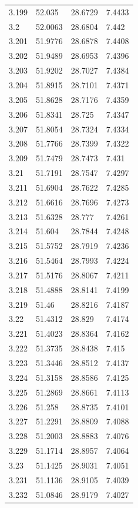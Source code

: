\begin{tabular}{llll}
3.199 & 52.035 & 28.6729 & 7.4433 \\
3.2 & 52.0063 & 28.6804 & 7.442 \\
3.201 & 51.9776 & 28.6878 & 7.4408 \\
3.202 & 51.9489 & 28.6953 & 7.4396 \\
3.203 & 51.9202 & 28.7027 & 7.4384 \\
3.204 & 51.8915 & 28.7101 & 7.4371 \\
3.205 & 51.8628 & 28.7176 & 7.4359 \\
3.206 & 51.8341 & 28.725 & 7.4347 \\
3.207 & 51.8054 & 28.7324 & 7.4334 \\
3.208 & 51.7766 & 28.7399 & 7.4322 \\
3.209 & 51.7479 & 28.7473 & 7.431 \\
3.21 & 51.7191 & 28.7547 & 7.4297 \\
3.211 & 51.6904 & 28.7622 & 7.4285 \\
3.212 & 51.6616 & 28.7696 & 7.4273 \\
3.213 & 51.6328 & 28.777 & 7.4261 \\
3.214 & 51.604 & 28.7844 & 7.4248 \\
3.215 & 51.5752 & 28.7919 & 7.4236 \\
3.216 & 51.5464 & 28.7993 & 7.4224 \\
3.217 & 51.5176 & 28.8067 & 7.4211 \\
3.218 & 51.4888 & 28.8141 & 7.4199 \\
3.219 & 51.46 & 28.8216 & 7.4187 \\
3.22 & 51.4312 & 28.829 & 7.4174 \\
3.221 & 51.4023 & 28.8364 & 7.4162 \\
3.222 & 51.3735 & 28.8438 & 7.415 \\
3.223 & 51.3446 & 28.8512 & 7.4137 \\
3.224 & 51.3158 & 28.8586 & 7.4125 \\
3.225 & 51.2869 & 28.8661 & 7.4113 \\
3.226 & 51.258 & 28.8735 & 7.4101 \\
3.227 & 51.2291 & 28.8809 & 7.4088 \\
3.228 & 51.2003 & 28.8883 & 7.4076 \\
3.229 & 51.1714 & 28.8957 & 7.4064 \\
3.23 & 51.1425 & 28.9031 & 7.4051 \\
3.231 & 51.1136 & 28.9105 & 7.4039 \\
3.232 & 51.0846 & 28.9179 & 7.4027 \\

\end{tabular}
